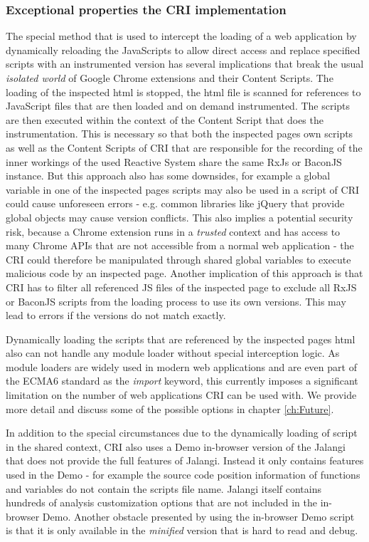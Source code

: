 	\subsubsection{Exceptional properties the CRI implementation}
	The special method that is used to intercept the loading of a web application by dynamically reloading the JavaScripts to allow direct access and replace specified scripts with an instrumented version has several implications that break the usual \emph{isolated world} \cite{GoogleApiContentScripts} of Google Chrome extensions and their Content Scripts. The loading of the inspected html is stopped, the html file is scanned for references to JavaScript files that are then loaded and on demand instrumented. The scripts are then executed within the context of the Content Script that does the instrumentation. This is necessary so that both the inspected pages own scripts as well as the Content Scripts of CRI that are responsible for the recording of the inner workings of the used Reactive System share the same RxJs or BaconJS instance. But this approach also has some downsides, for example a global variable in one of the inspected pages scripts may also be used in a script of CRI could cause unforeseen errors - e.g. common libraries like jQuery \cite{jQuery} that provide global objects may cause version conflicts. This also implies a potential security risk, because a Chrome extension runs in a \emph{trusted} context and has access to many Chrome APIs that are not accessible from a normal web application - the CRI could therefore be manipulated through shared global variables to execute malicious code by an inspected page.
	Another implication of this approach is that CRI has to filter all referenced JS files of the inspected page to exclude all RxJS or BaconJS scripts from the loading process to use its own versions. This may lead to errors if the versions do not match exactly.
	
	Dynamically loading the scripts that are referenced by the inspected pages html also can not handle any module loader without special interception logic. As module loaders are widely used in modern web applications and are even part of the ECMA6 \cite{ECMA6import} standard as the \emph{import} keyword, this currently imposes a significant limitation on the number of web applications CRI can be used with. We provide more detail and discuss some of the possible options in chapter \ref{ch:Future}.
	
	In addition to the special circumstances due to the dynamically loading of script in the shared context, CRI also uses a Demo \cite{JalangiDemo} in-browser version of the Jalangi \cite{Jalangi} that does not provide the full features of Jalangi. Instead it only contains features used in the Demo - for example the source code position information of functions and variables do not contain the scripts file name. Jalangi itself contains hundreds of analysis customization options that are not included in the in-browser Demo. Another obstacle presented by using the in-browser Demo script is that it is only available in the \emph{minified} version that is hard to read and debug.
	
